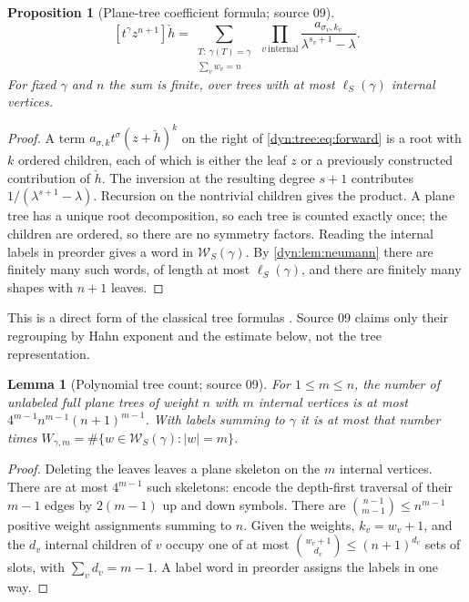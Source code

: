 \documentclass[11pt,letterpaper]{article}
\newtheorem{lemma}[lemma]{Lemma}
\newtheorem{proposition}[proposition]{Proposition}
\theoremstyle{definition}
\theoremstyle{remark}
\newcommand{\word}{\mathcal W}
\numberwithin{equation}{section}
\begin{document}
\begin{proposition}[Plane-tree coefficient formula; source 09]
\label{dyn:tree:prop:formula}
\begin{equation}\label{dyn:tree:eq:formula}
 [t^{\gamma}z^{n+1}]\check h
 =\sum_{\substack{T:\ \gamma(T)=\gamma\\ \sum_vw_v=n}}\
 \prod_{v\ \mathrm{internal}}
 \frac{a_{\sigma_v,k_v}}{\lambda^{s_v+1}-\lambda}.
\end{equation}
For fixed $\gamma$ and $n$ the sum is finite, over trees with at most
$\ell_S(\gamma)$ internal vertices.
\end{proposition}
\begin{proof}
A term $a_{\sigma,k}t^{\sigma}(z+\check h)^{k}$ on the right of
\eqref{dyn:tree:eq:forward} is a root with $k$ ordered children, each of
which is either the leaf $z$ or a previously constructed contribution of
$\check h$. The inversion at the resulting degree $s+1$ contributes
$1/(\lambda^{s+1}-\lambda)$. Recursion on the nontrivial children gives the
product. A plane tree has a unique root decomposition, so each tree is
counted exactly once; the children are ordered, so there are no symmetry
factors. Reading the internal labels in preorder gives a word in
$\word_S(\gamma)$. By \cref{dyn:lem:neumann} there are finitely many such
words, of length at most $\ell_S(\gamma)$, and there are finitely many shapes
with $n+1$ leaves.
\end{proof}

This is a direct form of the classical tree formulas
\cite{FauvetMenousSauzin}. Source 09 claims only their regrouping by Hahn
exponent and the estimate below, not the tree representation.

\begin{lemma}[Polynomial tree count; source 09]\label{dyn:tree:lem:count}
For $1\le m\le n$, the number of unlabeled full plane trees of weight $n$
with $m$ internal vertices is at most $4^{m-1}n^{m-1}(n+1)^{m-1}$. With
labels summing to $\gamma$ it is at most that number times
$W_{\gamma,m}=\#\{w\in\word_S(\gamma):|w|=m\}$.
\end{lemma}
\begin{proof}
Deleting the leaves leaves a plane skeleton on the $m$ internal vertices.
There are at most $4^{m-1}$ such skeletons: encode the depth-first traversal
of their $m-1$ edges by $2(m-1)$ up and down symbols. There are
$\binom{n-1}{m-1}\le n^{m-1}$ positive weight assignments summing to $n$.
Given the weights, $k_v=w_v+1$, and the $d_v$ internal children of $v$
occupy one of at most $\binom{w_v+1}{d_v}\le(n+1)^{d_v}$ sets of slots, with
$\sum_vd_v=m-1$. A label word in preorder assigns the labels in one way.
\end{proof}
\end{document}
